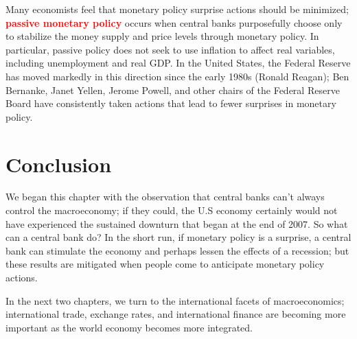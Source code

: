 \documentclass[11pt]{article} %
\begin{document}
Many economists feel that monetary policy surprise actions should be minimized; \textbf{\textcolor{red}{passive monetary policy}} occurs when central banks purposefully choose only to stabilize the money supply and price levels through monetary policy. In particular, passive policy does not seek to use inflation to affect real variables, including unemployment and real GDP. In the United States, the Federal Reserve has moved markedly in this direction since the early 1980s (Ronald Reagan); Ben Bernanke, Janet Yellen, Jerome Powell, and other chairs of the Federal Reserve Board have consistently taken actions that lead to fewer surprises in monetary policy.

\section*{\textbf{Conclusion}}
We began this chapter with the observation that central banks can't always control the macroeconomy; if they could, the U.S economy certainly would not have experienced the sustained downturn that began at the end of 2007. So what can a central bank do? In the short run, if monetary policy is a surprise, a central bank can stimulate the economy and perhaps lessen the effects of a recession; but these results are mitigated when people come to anticipate monetary policy actions.

In the next two chapters, we turn to the international facets of macroeconomics; international trade, exchange rates, and international finance are becoming more important as the world economy becomes more integrated.
\end{document}
